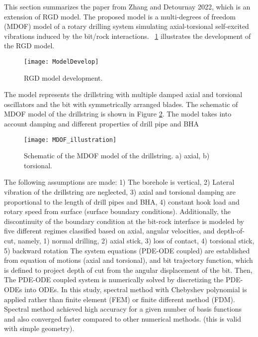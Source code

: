 This section summarizes the paper from Zhang and Detournay 2022, which is an extension of RGD model. The proposed model is a multi-degrees of freedom (MDOF) model of a rotary drilling system simulating axial-torsional self-excited vibrations induced by the bit/rock interactions. \figurename~\ref{model_develop_figure} illustrates the development of the RGD model.

\begin{figure}[ht]
  \centering
  \texttt{[image: ModelDevelop]}
  \caption[RGD model development]{RGD model development.}\label{model_develop_figure}
\end{figure}

The model represents the drillstring with multiple damped axial and torsional oscillators and the bit with symmetrically arranged blades. The schematic of MDOF model of the drillstring is shown in Figure \ref{MDOF_illustration}. The model takes into account damping and
different properties of drill pipe and BHA

\begin{figure}[ht]
  \centering
  \texttt{[image: MDOF\_illustration]}
  \caption[Schematic of the MDOF model of the drillstring]{Schematic of the MDOF model of the drillstring. a) axial, b) torsional.}\label{MDOF_illustration}
\end{figure}

The following assumptions are made: 1) The borehole is vertical, 2) Lateral vibration of the drillstring are neglected, 3) axial and torsional damping are proportional to the length of drill pipes and BHA, 4) constant hook load and rotary speed from surface (surface boundary conditions). Additionally, the discontinuity of the boundary condition at the bit-rock interface is modeled by
five different regimes classified based on axial, angular velocities, and depth-of-cut, namely, 1) normal drilling, 2) axial stick, 3) loss of contact, 4) torsional stick, 5) backward rotation
The system equations (PDE-ODE coupled) are established from equation of motions (axial and torsional), and bit trajectory function, which is defined to project depth of cut from the angular displacement of the bit. Then,
The PDE-ODE coupled system is numerically solved by discretizing the PDE-ODEs into ODEs. In this study, spectral method with Chebyshev polynomial is applied rather than finite element (FEM) or finite different method (FDM). Spectral method achieved high accuracy for a given number of basis functions and also converged faster compared to other numerical methods. (this is valid with simple geometry). 

